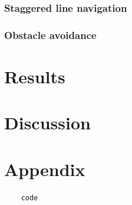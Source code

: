 \documentclass[12pt]{article}
\begin{document}
\subsubsection{Staggered line navigation}

\subsubsection{Obstacle avoidance}

\section{Results}


\section{Discussion}


\section*{Appendix}

\begin{verbatim}
	code
\end{verbatim}
\end{document}
